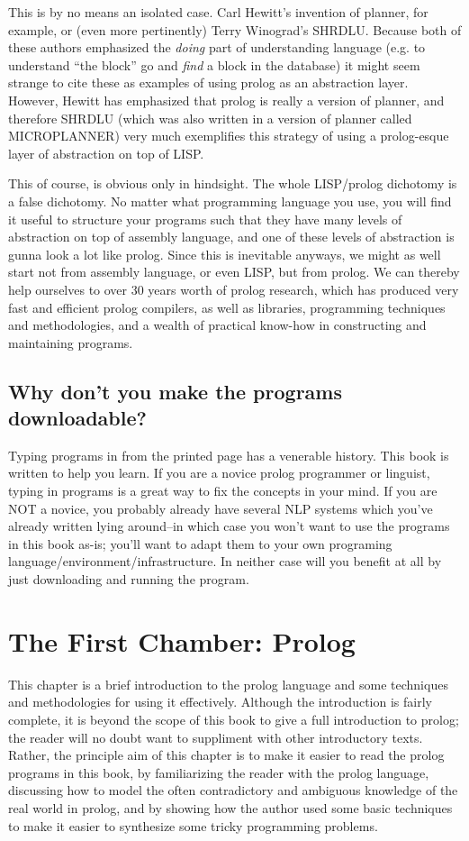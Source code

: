 \documentclass{book}[9pt]
\begin{document}
This is by no means an isolated case.  Carl Hewitt's invention of
planner, for example, or (even more pertinently) Terry Winograd's
SHRDLU.  Because both of these authors emphasized the {\em doing} part
of understanding language (e.g. to understand ``the block'' go and
{\em find} a block in the database) it might seem strange to cite
these as examples of using prolog as an abstraction layer.  However,
Hewitt has emphasized that prolog is really a version of planner, and
therefore SHRDLU (which was also written in a version of planner
called MICROPLANNER) very much exemplifies this strategy of using a
prolog-esque layer of abstraction on top of LISP.

This of course, is obvious only in hindsight. The whole LISP/prolog
dichotomy is a false dichotomy.  No matter what programming language
you use, you will find it useful to structure your programs such that
they have many levels of abstraction on top of assembly language, and
one of these levels of abstraction is gunna look a lot like prolog.
Since this is inevitable anyways, we might as well start not from
assembly language, or even LISP, but from prolog.  We can thereby help
ourselves to over 30 years worth of prolog research, which has
produced very fast and efficient prolog compilers, as well as
libraries, programming techniques and methodologies, and a wealth of
practical know-how in constructing and maintaining programs.


\section{Why don't you make the programs downloadable?}

Typing programs in from the printed page has a venerable history.
This book is written to help you learn.  If you are a novice prolog
programmer or linguist, typing in programs is a great way to fix the
concepts in your mind.  If you are NOT a novice, you probably already
have several NLP systems which you've already written lying around--in
which case you won't want to use the programs in this book as-is;
you'll want to adapt them to your own programing
language/environment/infrastructure.  In neither case will you benefit
at all by just downloading and running the program.


\chapter{The First Chamber: Prolog}

This chapter is a brief introduction to the prolog language and some
techniques and methodologies for using it effectively.  Although the
introduction is fairly complete, it is beyond the scope of this book
to give a full introduction to prolog; the reader will no doubt want
to suppliment with other introductory texts.  Rather, the principle
aim of this chapter is to make it easier to read the prolog programs
in this book, by familiarizing the reader with the prolog language,
discussing how to model the often contradictory and ambiguous
knowledge of the real world in prolog, and by showing how the author
used some basic techniques to make it easier to synthesize some tricky
programming problems.
\end{document}
